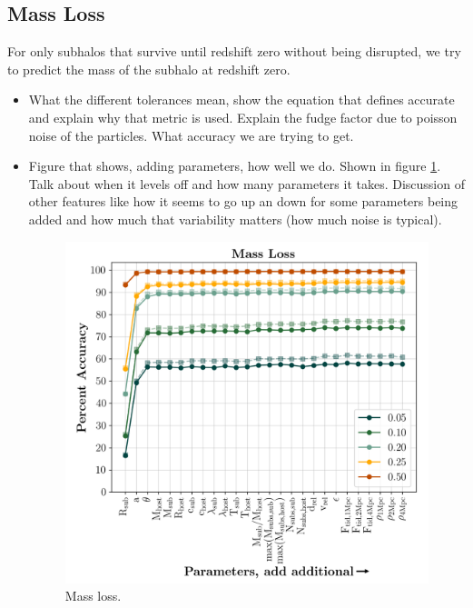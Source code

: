 \documentclass[fleqn,usenatbib]{mnras}
\begin{document}
\subsection{Mass Loss}
\label{sec:mass loss}
For only subhalos that survive until redshift zero without being disrupted, we try to predict the mass of the subhalo at redshift zero.
\begin{itemize}
	\item {} What the different tolerances mean, show the equation that defines accurate and explain why that metric is used. Explain the fudge factor due to poisson noise of the particles. What accuracy we are trying to get.
	\item Figure that shows, adding parameters, how well we do. Shown in figure \ref{fig:massloss_predictions}. Talk about when it levels off and how many parameters it takes. Discussion of other features like how it seems to go up an down for some parameters being added and how much that variability matters (how much noise is typical).
\begin{figure}
	\includegraphics[width=\columnwidth]{Figures/massloss_predictions}
    \caption{Mass loss.}
    \label{fig:massloss_predictions}
\end{figure}

\end{itemize}
\end{document}
